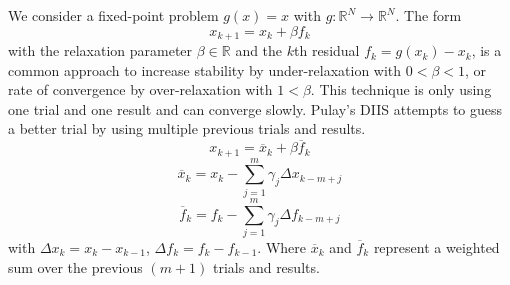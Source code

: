 We consider a fixed-point problem \(g(x) = x\) with \(g\colon \mathbb{R}^N \to \mathbb{R}^N\). The form \[x_{k+1} = x_k + \beta f_k\] with the relaxation parameter \(\beta \in \mathbb{R}\) and the \(k\)th residual \(f_k = g(x_k) - x_k\), is a common approach to increase stability by under-relaxation with \(0 < \beta < 1\), or rate of convergence by over-relaxation with \(1 < \beta\). This technique is only using one trial and one result and can converge slowly. Pulay's DIIS attempts to guess a better trial by using multiple previous trials and results. \[x_{k+1} = \overline{x}_k + \beta \overline{f}_k\] \[\overline{x}_{k} = x_k - \sum_{j=1}^{m} \gamma_j {\Delta x}_{k-m+j}\] \[\overline{f}_{k} = f_k - \sum_{j=1}^{m} \gamma_j {\Delta f}_{k-m+j}\] with \({\Delta x}_{k} = x_k - x_{k-1}\), \({\Delta f}_{k} = f_k - f_{k-1}\). Where \(\overline{x}_{k}\) and \(\overline{f}_{k}\) represent a weighted sum over the previous \((m+1)\) trials and results.

